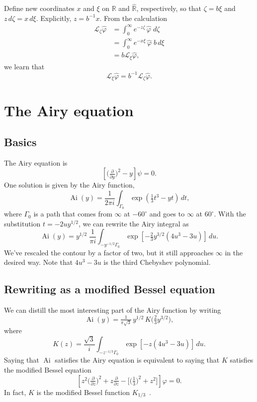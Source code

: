 \documentclass{article}
\newcommand{\R}{\mathbb{R}}
\newcommand{\laplace}{\mathcal{L}}
\DeclareMathOperator{\Ai}{Ai}
\begin{document}
Define new coordinates $x$ and $\xi$ on $\R$ and $\hat{\R}$, respectively, so that $\zeta = b\xi$ and $z\,d\zeta = x\,d\xi$. Explicitly, $z = b^{-1}x$. From the calculation
\begin{align*}
\laplace_\zeta \hat{\varphi} & = \int_0^\infty e^{-z \zeta}\,\hat{\varphi}\;d\zeta \\
& = \int_0^\infty e^{-x\xi}\,\hat{\varphi}\;b\,d\xi \\
& = b \laplace_\xi \hat{\varphi},
\end{align*}
we learn that
\[ \laplace_\xi \hat{\varphi} = b^{-1} \laplace_\zeta \hat{\varphi}. \]
\section{The Airy equation}
\subsection{Basics}
The Airy equation is
\begin{equation}\label{eqn:airy}
\left[\big(\tfrac{\partial}{\partial y}\big)^2 - y\right] \psi = 0.
\end{equation}
One solution is given by the Airy function,
\[ \Ai(y) = \frac{1}{2\pi i} \int_{\Gamma_0} \exp\left(\tfrac{1}{3}t^3 - yt\right)\,dt, \]
where $\Gamma_0$ is a path that comes from $\infty$ at $-60^\circ$ and goes to $\infty$ at $60^\circ$. With the substitution $t = -2uy^{1/2}$, we can rewrite the Airy integral as
\[ \Ai(y) = y^{1/2}\;\frac{1}{\pi i} \int_{-y^{-1/2} \Gamma_0} \exp\left[-\tfrac{2}{3}y^{3/2} \left(4u^3 - 3u\right)\right]\,du. \]
We've rescaled the contour by a factor of two, but it still approaches $\infty$ in the desired way. Note that $4u^3 - 3u$ is the third Chebyshev polynomial.
\subsection{Rewriting as a modified Bessel equation}
We can distill the most interesting part of the Airy function by writing
\[ \Ai(y) = \tfrac{1}{\pi\sqrt{3}}\,y^{1/2}\, K\big(\tfrac{2}{3} y^{3/2}\big), \]
where
\[ K(z) = \frac{\sqrt{3}}{i} \int_{-z^{-1/3}\Gamma_0} \exp\left[-z \left(4u^3 - 3u\right)\right]\,du. \]
Saying that $\Ai$ satisfies the Airy equation is equivalent to saying that $K$ satisfies the modified Bessel equation
\begin{equation}\label{eqn:mod-bessel}
\left[z^2 \big(\tfrac{\partial}{\partial z}\big)^2 + z \tfrac{\partial}{\partial z} - \big[\big(\tfrac{1}{3}\big)^2 + z^2\big]\right] \varphi = 0.
\end{equation}
In fact, $K$ is the modified Bessel function $K_{1/3}$~\cite[equation~9.6.1]{dlmf}.
\end{document}
